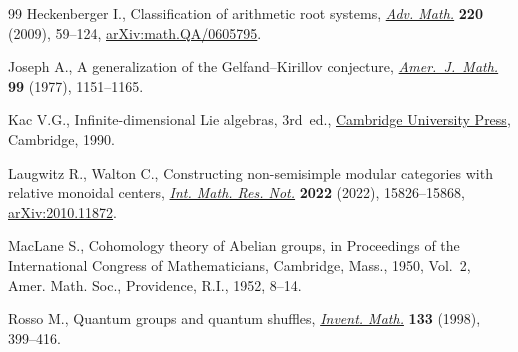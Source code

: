 \documentclass[pdftex]{sigma}
\numberwithin{equation}{section}
\begin{document}
\begin{thebibliography}{99}
Heckenberger I., Classification of arithmetic root systems, \href{https://doi.org/10.1016/j.aim.2008.08.005}{\textit{Adv. Math.}}
 \textbf{220} (2009), 59--124, \href{https://arxiv.org/abs/math.QA/0605795}{arXiv:math.QA/0605795}.

Joseph A., A generalization of the {G}elfand--{K}irillov conjecture,
 \href{https://doi.org/10.2307/2374020}{\textit{Amer.~J.~Math.}} \textbf{99} (1977), 1151--1165.

Kac V.G., Infinite-dimensional {L}ie algebras, 3rd~ed., \href{https://doi.org/10.1017/CBO9780511626234}{Cambridge University
 Press}, Cambridge, 1990.

Laugwitz R., Walton C., Constructing non-semisimple modular categories with
 relative monoidal centers, \href{https://doi.org/10.1093/imrn/rnab097}{\textit{Int. Math. Res. Not.}} \textbf{2022}
 (2022), 15826--15868, \href{https://arxiv.org/abs/2010.11872}{arXiv:2010.11872}.

MacLane S., Cohomology theory of {A}belian groups, in Proceedings of the
 {I}nternational {C}ongress of {M}athematicians, {C}ambridge, {M}ass., 1950,
 Vol.~2, Amer. Math. Soc., Providence, R.I., 1952, 8--14.

Rosso M., Quantum groups and quantum shuffles, \href{https://doi.org/10.1007/s002220050249}{\textit{Invent. Math.}}
 \textbf{133} (1998), 399--416.

\end{thebibliography}\LastPageEnding
\end{document}
